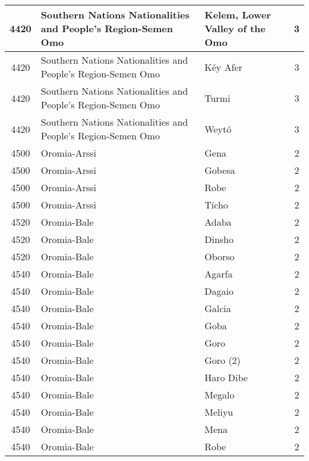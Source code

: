 \documentclass[12pt,a4paper]{report}
\begin{document}
\begin{tabular}{|c|l|l|c|}
\hline 
\rule[-1ex]{0pt}{2.5ex} 4420 & Southern Nations Nationalities and People's Region-Semen Omo & Kelem, Lower Valley of the Omo & 3 \\
\hline 
\rule[-1ex]{0pt}{2.5ex} 4420 & Southern Nations Nationalities and People's Region-Semen Omo & K\'ey Afer & 3 \\ 
\hline 
\rule[-1ex]{0pt}{2.5ex} 4420 & Southern Nations Nationalities and People's Region-Semen Omo & Turmi & 3 \\ 
\hline 
\rule[-1ex]{0pt}{2.5ex} 4420 & Southern Nations Nationalities and People's Region-Semen Omo & Weyt\'o & 3 \\ 
\hline 
\rule[-1ex]{0pt}{2.5ex} 4500 & Oromia-Arssi & Gena & 2 \\ 
\hline 
\rule[-1ex]{0pt}{2.5ex} 4500 & Oromia-Arssi & Gobesa & 2 \\ 
\hline 
\rule[-1ex]{0pt}{2.5ex} 4500 & Oromia-Arssi & Robe & 2 \\  
\hline 
\rule[-1ex]{0pt}{2.5ex} 4500 & Oromia-Arssi & T\'icho & 2 \\ 
\hline 
\rule[-1ex]{0pt}{2.5ex} 4520 & Oromia-Bale & Adaba & 2 \\ 
\hline 
\rule[-1ex]{0pt}{2.5ex} 4520 & Oromia-Bale & Dinsho & 2 \\ 
\hline 
\rule[-1ex]{0pt}{2.5ex} 4520 & Oromia-Bale & Oborso & 2 \\ 
\hline 
\rule[-1ex]{0pt}{2.5ex} 4540 & Oromia-Bale & Agarfa & 2 \\ 
\hline 
\rule[-1ex]{0pt}{2.5ex} 4540 & Oromia-Bale & Dagaio & 2 \\ 
\hline 
\rule[-1ex]{0pt}{2.5ex} 4540 & Oromia-Bale & Galcia & 2 \\ 
\hline 
\rule[-1ex]{0pt}{2.5ex} 4540 & Oromia-Bale & Goba & 2 \\ 
\hline 
\rule[-1ex]{0pt}{2.5ex} 4540 & Oromia-Bale & Goro & 2 \\ 
\hline 
\rule[-1ex]{0pt}{2.5ex} 4540 & Oromia-Bale & Goro (2) & 2 \\ 
\hline 
\rule[-1ex]{0pt}{2.5ex} 4540 & Oromia-Bale & Haro Dibe & 2 \\ 
\hline 
\rule[-1ex]{0pt}{2.5ex} 4540 & Oromia-Bale & Megalo & 2 \\ 
\hline 
\rule[-1ex]{0pt}{2.5ex} 4540 & Oromia-Bale & Meliyu & 2 \\ 
\hline 
\rule[-1ex]{0pt}{2.5ex} 4540 & Oromia-Bale & Mena & 2 \\ 
\hline 
\rule[-1ex]{0pt}{2.5ex} 4540 & Oromia-Bale & Robe & 2 \\ 
\hline 

\end{tabular}
\end{document}
